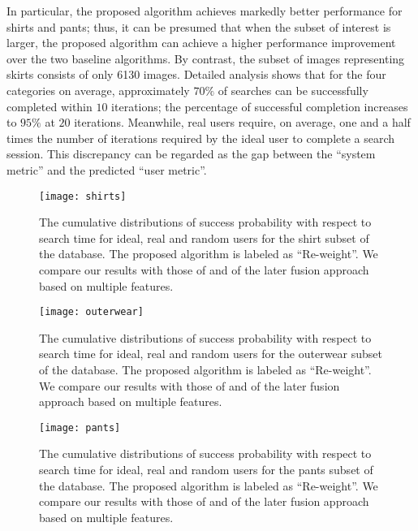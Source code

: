 \documentclass[journal]{IEEEtran}
\begin{document}
In particular, the proposed algorithm achieves markedly better performance for shirts and pants; thus, it can be presumed that when the subset of interest is larger, the proposed algorithm can achieve a higher performance improvement over the two baseline algorithms. By contrast, the subset of images representing skirts consists of only 6130 images. Detailed analysis shows that for the four categories on average, approximately $70\%$ of searches can be successfully completed within $10$ iterations; the percentage of successful completion increases to $95\%$ at $20$ iterations. Meanwhile, real users require, on average, one and a half times the number of iterations required by the ideal user to complete a search session. This discrepancy can be regarded as the gap between the ``system metric'' and the predicted ``user metric''.



\begin{figure}[!t]
\centering
\texttt{[image: shirts]}
\caption{The cumulative distributions of success probability with respect to search time for ideal, real and random users for the shirt subset of the database. The proposed algorithm is labeled as ``Re-weight''. We compare our results with those of \cite{fang2005experiments} and of the later fusion approach based on multiple features. }
\label{fig::flow}
\end{figure}

\begin{figure}[!t]
\centering
\texttt{[image: outerwear]}
\caption{The cumulative distributions of success probability with respect to search time for ideal, real and random users for the outerwear subset of the database. The proposed algorithm is labeled as ``Re-weight''. We compare our results with those of \cite{fang2005experiments} and of the later fusion approach based on multiple features. }
\label{fig::flow2}
\end{figure}

\begin{figure}[!t]
\centering
\texttt{[image: pants]}
\caption{The cumulative distributions of success probability with respect to search time for ideal, real and random users for the pants subset of the database. The proposed algorithm is labeled as ``Re-weight''. We compare our results with those of \cite{fang2005experiments} and of the later fusion approach based on multiple features. }
\label{fig::flow3}
\end{figure}
\end{document}
